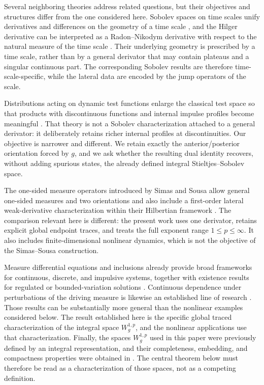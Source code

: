 \documentclass[preprint,12pt]{elsarticle}
\newenvironment{revision}{\begingroup\color{red}}{\endgroup}
\newenvironment{revision}{}{}
\newenvironment{finalrevision}{\begingroup\color{red}}{\endgroup}
\newenvironment{finalrevision}{}{}
\theoremstyle{definition}
\theoremstyle{remark}
\begin{document}
\begin{revision}
Several neighboring theories address related questions, but their objectives and
structures differ from the one considered here. Sobolev spaces on time scales
unify derivatives and differences on the geometry of a time scale
\cite{Agarwal2006}, and the Hilger derivative can be interpreted as a
Radon--Nikodym derivative with respect to the natural measure of the time scale
\cite{EckhardtTeschl2012}. Their underlying geometry is prescribed by a time
scale, rather than by a general derivator that may contain plateaus and a singular
continuous part. The corresponding Sobolev results are therefore
time-scale-specific, while the lateral data are encoded by the jump operators of
the scale.

Distributions acting on dynamic test functions enlarge the classical test space
so that products with discontinuous functions and internal impulse profiles become
meaningful \cite{DerrKinzebulatov2006,Kinzebulatov2007}. That theory is not a
Sobolev characterization attached to a general derivator: it deliberately retains
richer internal profiles at discontinuities. Our objective is narrower and
different. We retain exactly the anterior/posterior orientation forced by \(g\),
and we ask whether the resulting dual identity recovers, without adding spurious
states, the already defined integral Stieltjes--Sobolev space.

\begin{finalrevision}
The one-sided measure operators introduced by Simas and Sousa allow general
one-sided measures and two orientations and also include a first-order lateral
weak-derivative characterization within their Hilbertian framework
\cite{SimasSousa2025}. The comparison relevant here is different: the present
work uses one derivator, retains explicit global endpoint traces, and treats the
full exponent range \(1\le p\le\infty\). It also includes finite-dimensional
nonlinear dynamics, which is not the objective of the Simas--Sousa
construction.
\end{finalrevision}

Measure differential equations and inclusions already provide broad frameworks
for continuous, discrete, and impulsive systems, together with existence results
for regulated or bounded-variation solutions
\cite{CichonSatco2014,MonteiroSatco2019}. Continuous dependence under
perturbations of the driving measure is likewise an established line of research
\cite{MarraffaSatco2022}. \begin{finalrevision}
Those results can be substantially more general than the nonlinear examples
considered below. The result established here is the specific global traced
characterization of the integral space \(W_g^{1,p}\), and the nonlinear
applications use that characterization.
\end{finalrevision}
Finally, the spaces \(W_g^{1,p}\) used in this paper were previously defined by
an integral representation, and their completeness, embedding, and compactness
properties were obtained in \cite{FerToVil24}. The central theorem below must
therefore be read as a characterization of those spaces, not as a competing
definition.
\end{revision}
\end{document}
